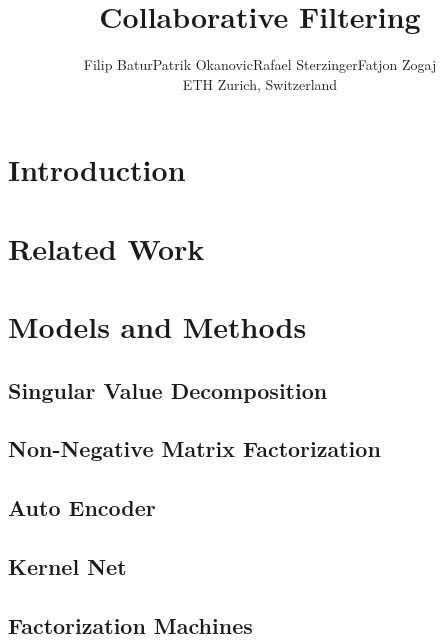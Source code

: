 \documentclass[10pt,conference,compsocconf]{IEEEtran}
\newcommand{\spacing}{\hspace{1cm}}
\begin{document}
    \title{Collaborative Filtering}

    \author{
    Filip Batur\spacing Patrik Okanovic\spacing Rafael Sterzinger\spacing Fatjon Zogaj\\
    ETH Zurich, Switzerland
    }

    \maketitle

    \begin{abstract}

    \end{abstract}


    \section{Introduction}


    \section{Related Work}


    \section{Models and Methods}

    \subsection{Singular Value Decomposition}

    \subsection{Non-Negative Matrix Factorization}

    \subsection{Auto Encoder}

    \subsection{Kernel Net}

    \subsection{Factorization Machines}
\end{document}
